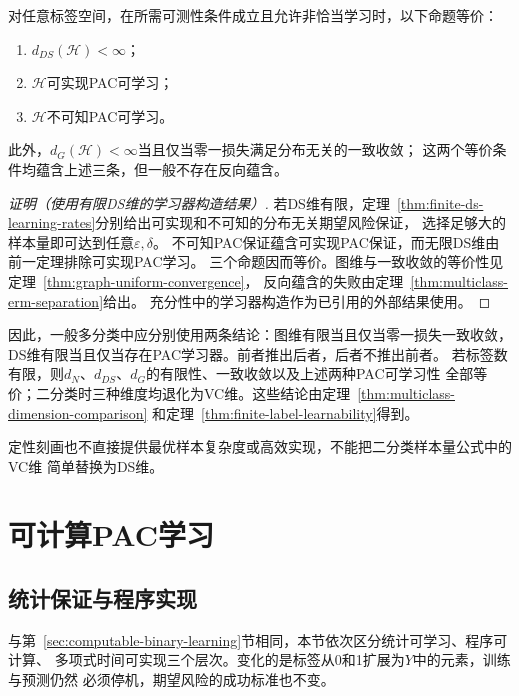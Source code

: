 \begin{theorem}[多分类学习基本定理]
\label{thm:ds-characterization}
对任意标签空间，在所需可测性条件成立且允许非恰当学习时，以下命题等价：
\begin{enumerate}
 \item $d_{DS}(\mathcal H)<\infty$；
 \item $\mathcal H$可实现PAC可学习；
 \item $\mathcal H$不可知PAC可学习。
\end{enumerate}
此外，$d_G(\mathcal H)<\infty$当且仅当零一损失满足分布无关的一致收敛；
这两个等价条件均蕴含上述三条，但一般不存在反向蕴含。
\end{theorem}

\begin{proof}[证明（使用有限DS维的学习器构造结果）]
若DS维有限，定理~\ref{thm:finite-ds-learning-rates}分别给出可实现和不可知的分布无关期望风险保证，
选择足够大的样本量即可达到任意$\varepsilon,\delta$。
不可知PAC保证蕴含可实现PAC保证，而无限DS维由前一定理排除可实现PAC学习。
三个命题因而等价。图维与一致收敛的等价性见定理~\ref{thm:graph-uniform-convergence}，
反向蕴含的失败由定理~\ref{thm:multiclass-erm-separation}给出。
充分性中的学习器构造作为已引用的外部结果使用。
\end{proof}

因此，一般多分类中应分别使用两条结论：图维有限当且仅当零一损失一致收敛，
DS维有限当且仅当存在PAC学习器。前者推出后者，后者不推出前者。
若标签数有限，则$d_N$、$d_{DS}$、$d_G$的有限性、一致收敛以及上述两种PAC可学习性
全部等价；二分类时三种维度均退化为VC维。这些结论由定理~\ref{thm:multiclass-dimension-comparison}
和定理~\ref{thm:finite-label-learnability}得到。

定性刻画也不直接提供最优样本复杂度或高效实现，不能把二分类样本量公式中的VC维
简单替换为DS维。

\section{可计算PAC学习}
\label{sec:computable-multiclass-learning}

\subsection{统计保证与程序实现}

与第~\ref{sec:computable-binary-learning}节相同，本节依次区分统计可学习、程序可计算、
多项式时间可实现三个层次。变化的是标签从0和1扩展为$Y$中的元素，训练与预测仍然
必须停机，期望风险的成功标准也不变。

